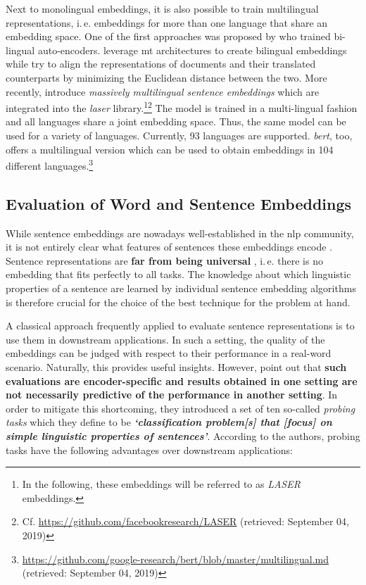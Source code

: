  Next to monolingual embeddings, it is also possible to train multilingual representations, i.\,e. embeddings for more than one language that share an embedding space. One of the first approaches was proposed by \citep{Chandar.2013} who trained bi-lingual auto-encoders. \citep{Espana-Bonet.2017} leverage \gls{mt} architectures to create bilingual embeddings while \citep{Zhou.2016} try to align the representations of documents and their translated counterparts by minimizing the Euclidean distance between the two. More recently, \citep{Artetxe.2018} introduce \textit{massively multilingual sentence embeddings} which are integrated into the \textit{\gls{laser}} library.\footnote{In the following, these embeddings will be referred to as \textit{LASER} embeddings.}\footnote{Cf. \url{https://github.com/facebookresearch/LASER} (retrieved: September 04, 2019)} The model is trained in a multi-lingual fashion and all languages share a joint embedding space. Thus, the same model can be used for a variety of languages. Currently, 93 languages are supported. \textit{\gls{bert}}, too, offers a multilingual version which can be used to obtain embeddings in 104 different languages.\footnote{\url{https://github.com/google-research/bert/blob/master/multilingual.md} (retrieved: September 04, 2019)}

\subsection{Evaluation of Word and Sentence Embeddings}
\label{sec:rel_work_eval}

While sentence embeddings are nowadays well-established in the \gls{nlp} community, it is not entirely clear what features of sentences these embeddings encode \citep[inter alia]{Conneau.2018a}. Sentence representations are \textbf{far from being universal} \citep{Perone.2018}, i.\,e. there is no embedding that fits perfectly to all tasks. The knowledge about which linguistic properties of a sentence are learned by individual sentence embedding algorithms is therefore crucial for the choice of the best technique for the problem at hand.

A classical approach frequently applied to evaluate sentence representations is to use them in downstream applications. In such a setting, the quality of the embeddings can be judged with respect to their performance in a real-word scenario. Naturally, this provides useful insights. However, \citep{Conneau.2018a} point out that \textbf{such evaluations are encoder-specific and results obtained in one setting are not necessarily predictive of the performance in another setting}. In order to mitigate this shortcoming, they introduced a set of ten so-called \textit{probing tasks} which they define to be \textbf{\textit{`classification problem[s] that [focus] on simple linguistic properties of sentences'}}. According to the authors, probing tasks have the following advantages over downstream applications:

